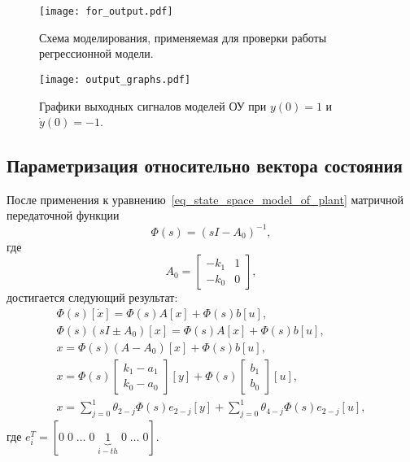 \begin{figure}[p]
    \centering
    \texttt{[image: for\_output.pdf]}
    \caption{Схема моделирования, применяемая для проверки работы регрессионной модели.}
    \label{img_for_output}
\end{figure}

\begin{figure}[p]
    \centering
    \texttt{[image: output\_graphs.pdf]}
    \caption{Графики выходных сигналов моделей ОУ при $y(0)=1$ и $\dot{y}(0)=-1$.}
    \label{img_output_graphs}
\end{figure}


\newpage
\subsection{Параметризация относительно вектора состояния}
После применения к уравнению~\eqref{eq_state_space_model_of_plant} матричной передаточной функции
\begin{equation}
    \Phi(s) = (sI - A_0)^{-1},
\end{equation}
где
\begin{equation}
    A_0 =
    \begin{bmatrix}
        -k_1 & 1 \\
        -k_0 & 0
    \end{bmatrix} \!\!,
\end{equation}
достигается следующий результат:
\begin{gather}
    \Phi(s) [\dot{x}] = \Phi(s) A [x] + \Phi(s) b [u], \\
    \Phi(s) (sI \pm A_0) [x] = \Phi(s) A [x] + \Phi(s) b [u], \\ 
    x = \Phi(s) (A - A_0) [x] + \Phi(s) b [u], \\
    x = \Phi(s) 
    \begin{bmatrix}
        k_1 - a_1 \\ k_0 - a_0        
    \end{bmatrix}
    [y] + \Phi(s)
    \begin{bmatrix}
        b_1 \\ b_0
    \end{bmatrix}
    [u], \\
    x = \sum_{j=0}^{1} \theta_{2-j} \Phi(s) e_{2-j} [y] + \sum_{j=0}^{1} \theta_{4-j} \Phi(s) e_{2-j} [u],
\end{gather}
где $e_i^T = [0\;0\;\ldots\;0\;\underbrace{1}_{i-th}\;0\;\ldots\;0]$.

